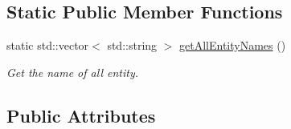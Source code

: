 \subsection*{Static Public Member Functions}
\begin{DoxyCompactItemize}
\item 
static std\+::vector$<$ std\+::string $>$ \hyperlink{class_scene_game_a0b61f99b30b1c18723eb9e34add60364}{get\+All\+Entity\+Names} ()
\begin{DoxyCompactList}\small\item\em Get the name of all entity. \end{DoxyCompactList}\end{DoxyCompactItemize}
\subsection*{Public Attributes}
